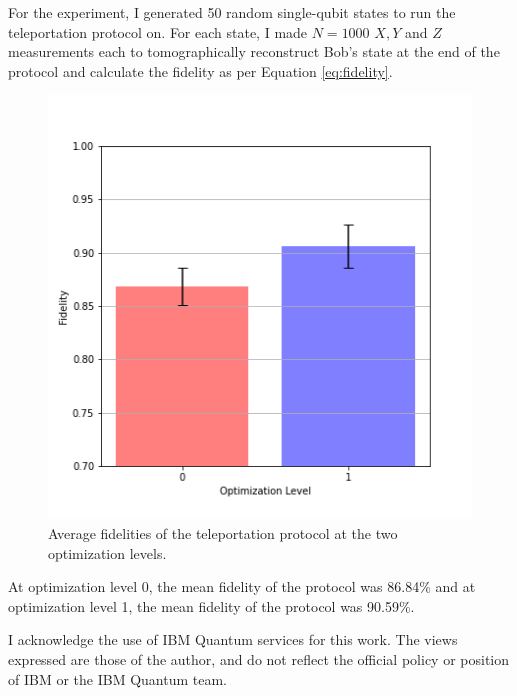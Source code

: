 \documentclass[prx,twocolumn]{revtex4-2}
\numberwithin{equation}{section}
\numberwithin{figure}{section}
\numberwithin{table}{section}
\begin{document}
For the experiment, I generated 50 random single-qubit states to run the teleportation protocol on. For each 
state, I made $N = 1000$ $X, Y$ and $Z$ measurements each to tomographically reconstruct Bob's state at the 
end of the protocol and calculate the fidelity as per Equation \ref{eq:fidelity}.
\begin{figure}[H]
    \centering
    \includegraphics[width=\columnwidth]{images/fidelity-vs-optimization-bar.png}
    \caption{Average fidelities of the teleportation protocol at the two optimization levels.}
\end{figure}

At optimization level 0, the mean fidelity of the protocol was 86.84\% and at optimization level 1, the 
mean fidelity of the protocol was 90.59\%.

\nocite{ibm-quantum}

\begin{acknowledgments}
    I acknowledge the use of IBM Quantum services for this work. The views expressed are those of the author, 
    and do not reflect the official policy or position of IBM or the IBM Quantum team.
\end{acknowledgments}


\end{document}
